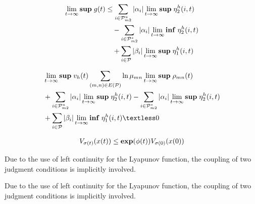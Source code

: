 \documentclass[twocolumn]{autart}    %
\begin{document}
\begin{pf}
    \begin{equation}
        \begin{aligned}
            \setlength{\arraycolsep}{0.9pt}
            \lim_{t \rightarrow \infty}\bold{sup}\;g(t)& \le\sum_{i \in \mathcal{P}_{m2}^{u}}\left|\alpha_{i}\right|\lim_{t \rightarrow \infty}\bold{sup}\;\eta_{2}^{h}(i,t)\\
            & \quad-\sum_{i \in \mathcal{P}_{m2}^{s}}\left|\alpha_{i}\right|\lim_{t \rightarrow \infty}\bold{inf}\;\eta_{2}^{h}(i,t)\\
            & \quad+\sum_{i \in \mathcal{P}}\left|\beta_{i}\right|\lim_{t \rightarrow \infty}\bold{sup}\;\eta_{1}^{h}(i,t)
        \end{aligned}
    \end{equation}
    
    \begin{equation}
        \begin{aligned}
            \setlength{\arraycolsep}{0.9pt}
            &\lim_{t \rightarrow \infty}\bold{sup}\; v_{h}(t)\sum_{(m,n) \in E(\mathcal{P})}\ln\mu_{mn}\lim_{t \rightarrow \infty}\bold{sup}\;\rho_{mn}(t)\\
            &+\sum_{i \in \mathcal{P}_{m2}^{u}}\left|\alpha_{i}\right|\lim_{t \rightarrow \infty}\bold{sup}\;\eta_{2}^{h}(i,t)-\sum_{i \in \mathcal{P}_{m2}^{s}}\left|\alpha_{i}\right|\lim_{t \rightarrow \infty}\bold{sup}\;\eta_{2}^{h}(i,t)\\
            &+\sum_{i \in \mathcal{P}}\left|\beta_{i}\right|\lim_{t \rightarrow \infty}\bold{inf}\;\eta_{1}^{h}(i,t) \textless 0
        \end{aligned}
    \end{equation}
    
    \begin{equation}
        \begin{aligned}
            \setlength{\arraycolsep}{0.9pt}
            V_{\sigma(t)}(x(t)) \le \bold{exp}(\phi(t))V_{\sigma(0)}(x(0))
        \end{aligned}
    \end{equation}
\end{pf}

\begin{rmk}
    Due to the use of left continuity for the Lyapunov function, the coupling of two judgment conditions is implicitly involved.
\end{rmk}

\begin{rmk}
    Due to the use of left continuity for the Lyapunov function, the coupling of two judgment conditions is implicitly involved.
\end{rmk}
\end{document}
